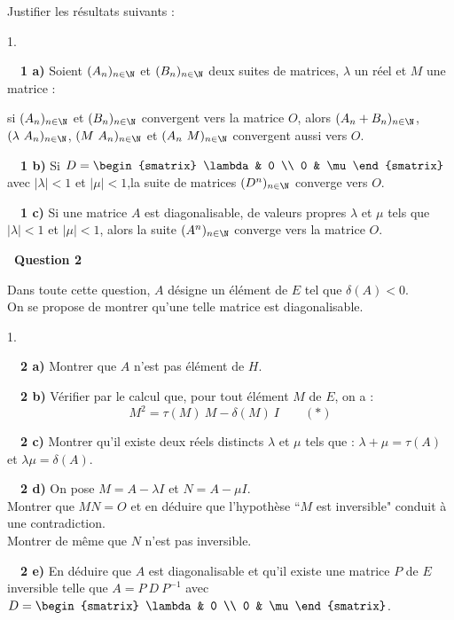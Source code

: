 \documentclass[11pt]{article}%
\begin{document}
Justifier les résultats suivants :

\begin{noliste}{1.}
 \setlength{\itemsep}{4mm}
\item[ \ \textbf{\ 1 a)}] Soient $(A_{n})_{n \in \N}$ et $(B_{n})_{n
\in 
\N}$ deux suites de matrices, $\lambda$ un réel et $M$ une matrice :

si $(A_{n})_{n \in \N}$ et $(B_{n})_{n \in \N}$ convergent vers
la matrice $O$, alors $(A_{n} + B_{n})_{n \in \N}$, $(\lambda \
A_{n})_{n
\in \N}$, $(M \ A_{n})_{n \in \N}$ et $(A_{n}\ M)_{n \in \N}$
convergent aussi vers $O$.

\item[ \ \textbf{\ 1 b)}] Si $D = 
\begin{smatrix}
\lambda & 0 \\
0 & \mu
\end{smatrix}
$ avec $|\lambda|<1$ et $|\mu|<1$,la suite de matrices $(D^{n})_{n \in
\N}$ converge vers $O$.

\item[ \ \textbf{\ 1 c)}] Si une matrice $A$ est diagonalisable, de
valeurs
propres $\lambda$ et $\mu$ tels que $|\lambda|<1$ et $|\mu|<1$, alors
la
suite $(A^{n})_{n \in \N}$ converge vers la matrice $O$.
\end{noliste}

\textbf{\ Question 2}

Dans toute cette question, $A$ désigne un élément de $E$ tel que
$\delta(A)<0$.\\
On se propose de montrer qu'une telle matrice est diagonalisable.

\begin{noliste}{1.}
 \setlength{\itemsep}{4mm}
\item[ \ \textbf{\ 2 a)}] Montrer que $A$ n'est pas élément de $H$.

\item[ \ \textbf{\ 2 b)}] Vérifier par le calcul que, pour tout élément
$M
$ de $E$, on a : 
\[
M^{2} = \tau(M) \ M - \delta(M) \ I \qquad(*)
\]

\item[ \ \textbf{\ 2 c)}] Montrer qu'il existe deux réels distincts
$\lambda$
et $\mu$ tels que : $\lambda + \mu = \tau(A)$ et $\lambda \mu =
\delta(A).$

\item[ \ \textbf{\ 2 d)}] On pose $M = A - \lambda I$ et $N = A - \mu
I.$\\
Montrer que $M N = O$ et en déduire que l'hypothèse ``$M$ est
inversible"
conduit à une contradiction.\\
Montrer de même que $N$ n'est pas inversible.

\item[ \ \textbf{\ 2 e)}] En déduire que $A$ est diagonalisable et
qu'il
existe une matrice $P$ de $E$ inversible telle que $A = P \ D \ P^{-1}$
avec $D = 
\begin{smatrix}
\lambda & 0 \\
0 & \mu
\end{smatrix}
$.
\end{noliste}
\end{document}

